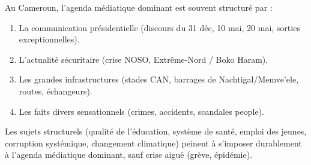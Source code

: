 \documentclass[11pt]{article}
\begin{document}
\begin{savaistu}
Au Cameroun, l'agenda médiatique dominant est souvent structuré par :
\begin{enumerate}
    \item La communication présidentielle (discours du 31 déc, 10 mai, 20 mai, sorties exceptionnelles).
    \item L'actualité sécuritaire (crise NOSO, Extrême-Nord / Boko Haram).
    \item Les grandes infrastructures (stades CAN, barrages de Nachtigal/Memve'ele, routes, échangeurs).
    \item Les faits divers sensationnels (crimes, accidents, scandales people).
\end{enumerate}
Les sujets structurels (qualité de l'éducation, système de santé, emploi des jeunes, corruption systémique, changement climatique) peinent à s'imposer durablement à l'agenda médiatique dominant, sauf crise aiguë (grève, épidémie).
\end{savaistu}
\end{document}
